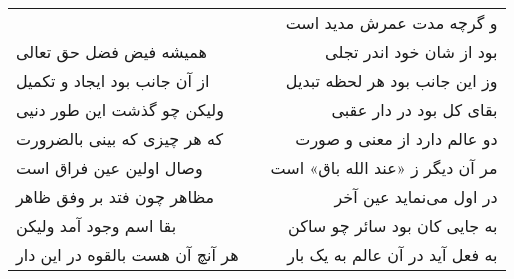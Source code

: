 \begin{center}
\begin{longtable}{l p{0.5cm} r}
&&
و گرچه مدت عمرش مدید است
\\
همیشه فیض فضل حق تعالی
&&
بود از شان خود اندر تجلی
\\
از آن جانب بود ایجاد و تکمیل
&&
وز این جانب بود هر لحظه تبدیل
\\
ولیکن چو گذشت این طور دنیی
&&
بقای کل بود در دار عقبی
\\
که هر چیزی که بینی بالضرورت
&&
دو عالم دارد از معنی و صورت
\\
وصال اولین عین فراق است
&&
مر آن دیگر ز «عند الله باق» است
\\
مظاهر چون فتد بر وفق ظاهر
&&
در اول می‌نماید عین آخر
\\
بقا اسم وجود آمد ولیکن
&&
به جایی کان بود سائر چو ساکن
\\
هر آنچ آن هست بالقوه در این دار
&&
به فعل آید در آن عالم به یک بار
\\
\end{longtable}
\end{center}
